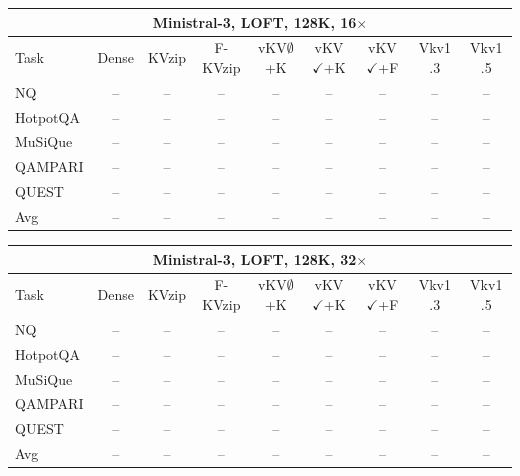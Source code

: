 \begin{tabular}{lcccccccc}
\toprule
\multicolumn{9}{c}{Ministral-3, LOFT, 128K, 16$\times$} \\
\midrule
Task & Dense & KVzip & F-KVzip & vKV$\emptyset$+K & vKV$\checkmark$+K & vKV$\checkmark$+F & Vkv1 .3 & Vkv1 .5 \\
\midrule
NQ & -- & -- & -- & -- & -- & -- & -- & -- \\
HotpotQA & -- & -- & -- & -- & -- & -- & -- & -- \\
MuSiQue & -- & -- & -- & -- & -- & -- & -- & -- \\
QAMPARI & -- & -- & -- & -- & -- & -- & -- & -- \\
QUEST & -- & -- & -- & -- & -- & -- & -- & -- \\
\midrule
Avg & -- & -- & -- & -- & -- & -- & -- & -- \\
\bottomrule
\end{tabular}
\vspace{0.8em}

\begin{tabular}{lcccccccc}
\toprule
\multicolumn{9}{c}{Ministral-3, LOFT, 128K, 32$\times$} \\
\midrule
Task & Dense & KVzip & F-KVzip & vKV$\emptyset$+K & vKV$\checkmark$+K & vKV$\checkmark$+F & Vkv1 .3 & Vkv1 .5 \\
\midrule
NQ & -- & -- & -- & -- & -- & -- & -- & -- \\
HotpotQA & -- & -- & -- & -- & -- & -- & -- & -- \\
MuSiQue & -- & -- & -- & -- & -- & -- & -- & -- \\
QAMPARI & -- & -- & -- & -- & -- & -- & -- & -- \\
QUEST & -- & -- & -- & -- & -- & -- & -- & -- \\
\midrule
Avg & -- & -- & -- & -- & -- & -- & -- & -- \\
\bottomrule
\end{tabular}
\vspace{0.8em}

